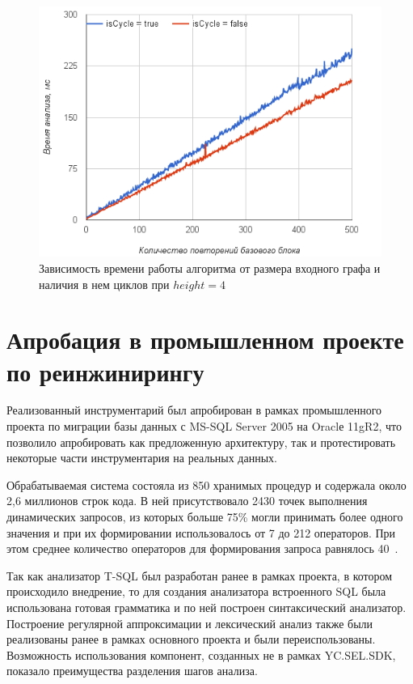 \begin{figure}[h!]
 \centering
 \includegraphics[width=15cm]{pics/heigh4.png}
 \caption{Зависимость времени работы алгоритма от размера входного графа и наличия в нем циклов при $height=4$}
 \label{CycleVsLinear}
\end{figure}


\section{Апробация в промышленном проекте по реинжинирингу}

Реализованный инструментарий был апробирован в рамках промышленного проекта по миграции базы данных с MS-SQL Server 2005 на Oraclе 11gR2, что позволило апробировать как предложенную архитектуру, так и протестировать некоторые части инструментария на реальных данных.

Обрабатываемая система состояла из 850 хранимых процедур и содержала около 2,6 миллионов строк кода. В ней присутствовало 2430 точек выполнения динамических запросов, из которых больше 75\% могли принимать более одного значения и при их формировании использовалось от 7 до 212 операторов. При этом среднее количество операторов для формирования запроса равнялось 40~\cite{Syrcose}.

Так как анализатор T-SQL был разработан ранее в рамках проекта, в котором происходило внедрение, то для создания анализатора встроенного SQL была использована готовая грамматика и по ней построен синтаксический анализатор. Построение регулярной аппроксимации и лексический анализ также были реализованы ранее в рамках основного проекта и были переиспользованы. Возможность использования компонент, созданных не в рамках YC.SEL.SDK, показало преимущества разделения шагов анализа.

